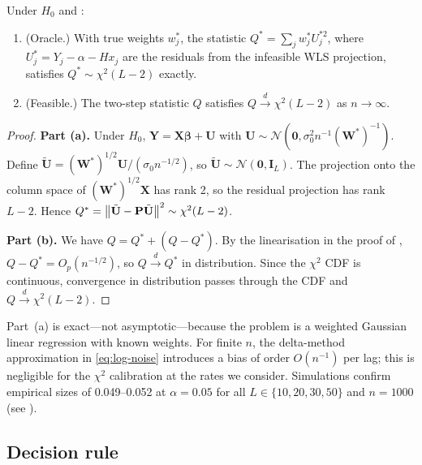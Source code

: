 \documentclass[10pt,a4paper,twocolumn]{article}
\newcommand{\dto}{\xrightarrow{d}}
\newcommand{\calN}{\mathcal{N}}
\begin{document}
\begin{theorem}
\label{thm:null-chi2}
Under $H_0$ and :
\begin{enumerate}[label=(\alph*)]
    \item \textup{(Oracle.)}  With true weights $w_j^*$, the statistic
    $Q^* = \sum_j w_j^* U_j^{*2}$, where $U_j^* = Y_j - \alpha - H x_j$
    are the residuals from the infeasible WLS projection,
    satisfies $Q^* \sim \chi^2(L-2)$ exactly.
    \item \textup{(Feasible.)}  The two-step statistic $Q$ satisfies
    $Q \dto \chi^2(L-2)$ as $n \to \infty$.
\end{enumerate}
\end{theorem}

\begin{proof}
\textbf{Part (a).}  Under $H_0$, $\mathbf{Y} = \mathbf{X}\boldsymbol\beta +
\mathbf{U}$ with $\mathbf{U} \sim \calN(\mathbf{0}, \sigma_0^2 n^{-1}
(\mathbf{W}^*)^{-1})$.  Define $\tilde{\mathbf{U}} =
(\mathbf{W}^*)^{1/2}\mathbf{U}/(\sigma_0 n^{-1/2})$, so $\tilde{\mathbf{U}}
\sim \calN(\mathbf{0}, \mathbf{I}_L)$.  The projection onto the column
space of $(\mathbf{W}^*)^{1/2}\mathbf{X}$ has rank 2, so the residual
projection has rank $L-2$.  Hence $Q^* = \left\|\tilde{\mathbf{U}} -
\mathbf{P}\tilde{\mathbf{U}}\right\|^2 \sim \chi^2(L-2)$.

\textbf{Part (b).}  We have $Q = Q^* + (Q - Q^*)$.  By the linearisation
in the proof of , $Q - Q^* = O_p(n^{-1/2})$,
so $Q \dto Q^*$ in distribution.  Since the $\chi^2$ CDF is continuous,
convergence in distribution passes through the CDF and $Q \dto \chi^2(L-2)$.
\end{proof}

\begin{remark}
    Part~(a) is exact---not asymptotic---because the problem is a
    weighted Gaussian linear regression with known weights.  For finite $n$,
    the delta-method approximation in \eqref{eq:log-noise} introduces a bias
    of order $O(n^{-1})$ per lag; this is negligible for the $\chi^2$
    calibration at the rates we consider.  Simulations confirm empirical
    sizes of 0.049--0.052 at $\alpha = 0.05$ for all $L \in \{10,20,30,50\}$
    and $n = 1000$ (see ).
\end{remark}

\subsection{Decision rule}
\end{document}
